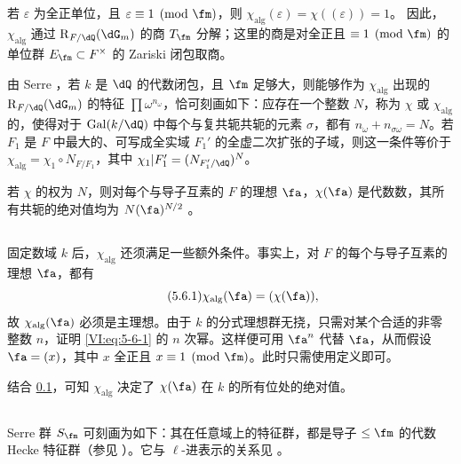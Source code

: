 \subsection{}\label{VI:5-5}
若 $\varepsilon$ 为全正单位，且 $\varepsilon\equiv1\pmod\fm$，则
$\chi_\text{alg}(\varepsilon)=\chi((\varepsilon))=1$。
因此，$\chi_\text{alg}$ 通过 $\res_{F/\dQ}(\dG_m)$ 的商 $T_\fm$ 分解；这里的商是对全正且 $\equiv1\pmod\fm$ 的单位群 $E_\fm\subset F^\times$ 的 Zariski 闭包取商。

由 Serre \cite[II.3]{se68}，若 $k$ 是 $\dQ$ 的代数闭包，且 $\fm$ 足够大，则能够作为 $\chi_\text{alg}$ 出现的 $\res_{F/\dQ}(\dG_m)$ 的特征 $\prod\omega^{n_\omega}$，恰可刻画如下：应存在一个整数 $N$，称为 $\chi$ 或 $\chi_\text{alg}$ 的，使得对于 $\gal(k/\dQ)$ 中每个与复共轭共轭的元素 $\sigma$，都有 $n_\omega+n_{\sigma\omega}=N$。若 $F_1$ 是 $F$ 中最大的、可写成全实域 $F_1'$ 的全虚二次扩张的子域，则这一条件等价于 $\chi_\text{alg}=\chi_1\circ N_{F/F_1}$，其中 $\chi_1|F_1'=(N_{F_1'/\dQ})^N$。

若 $\chi$ 的权为 $N$，则对每个与导子互素的 $F$ 的理想 $\fa$，$\chi(\fa)$ 是代数数，其所有共轭的绝对值均为 $N(\fa)^{N/2}$ \cite[II.3，命题 2]{se68}。

\subsection{}\label{VI:5-6}
固定数域 $k$ 后，$\chi_\text{alg}$ 还须满足一些额外条件。事实上，对 $F$ 的每个与导子互素的理想 $\fa$，都有
\begin{equation*}\tag{5.6.1}\label{VI:eq:5-6-1}
\chi_\text{alg}(\fa)=(\chi(\fa)),
\end{equation*}
故 $\chi_\text{alg}(\fa)$ 必须是主理想。由于 $k$ 的分式理想群无挠，只需对某个合适的非零整数 $n$，证明 \eqref{VI:eq:5-6-1} 的 $n$ 次幂。这样便可用 $\fa^n$ 代替 $\fa$，从而假设 $\fa=(x)$，其中 $x$ 全正且 $x\equiv1\pmod\fm$。此时只需使用定义即可。

结合 \ref{VI:5-5}，可知 $\chi_\text{alg}$ 决定了 $\chi(\fa)$ 在 $k$ 的所有位处的绝对值。

\subsection{}\label{VI:5-7}
Serre 群 $S_\fm$ 可刻画为如下：其在任意域上的特征群，都是导子 $\le\fm$ 的代数 Hecke 特征群（参见 \cite[II 2.1、2.2]{se68}）。它与 $\ell$-进表示的关系见 \cite[II 2.3]{se68}。

